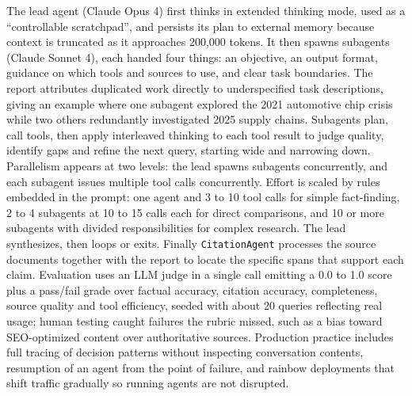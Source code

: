 The lead agent (Claude Opus 4) first thinks in extended thinking mode, used as a ``controllable scratchpad'', and persists its plan to external memory because context is truncated as it approaches 200{,}000 tokens. It then spawns subagents (Claude Sonnet 4), each handed four things: an objective, an output format, guidance on which tools and sources to use, and clear task boundaries. The report attributes duplicated work directly to underspecified task descriptions, giving an example where one subagent explored the 2021 automotive chip crisis while two others redundantly investigated 2025 supply chains. Subagents plan, call tools, then apply interleaved thinking to each tool result to judge quality, identify gaps and refine the next query, starting wide and narrowing down. Parallelism appears at two levels: the lead spawns subagents concurrently, and each subagent issues multiple tool calls concurrently. Effort is scaled by rules embedded in the prompt: one agent and 3 to 10 tool calls for simple fact-finding, 2 to 4 subagents at 10 to 15 calls each for direct comparisons, and 10 or more subagents with divided responsibilities for complex research. The lead synthesizes, then loops or exits. Finally \texttt{CitationAgent} processes the source documents together with the report to locate the specific spans that support each claim. Evaluation uses an LLM judge in a single call emitting a 0.0 to 1.0 score plus a pass/fail grade over factual accuracy, citation accuracy, completeness, source quality and tool efficiency, seeded with about 20 queries reflecting real usage; human testing caught failures the rubric missed, such as a bias toward SEO-optimized content over authoritative sources. Production practice includes full tracing of decision patterns without inspecting conversation contents, resumption of an agent from the point of failure, and rainbow deployments that shift traffic gradually so running agents are not disrupted.

\begin{center}
\end{center}

